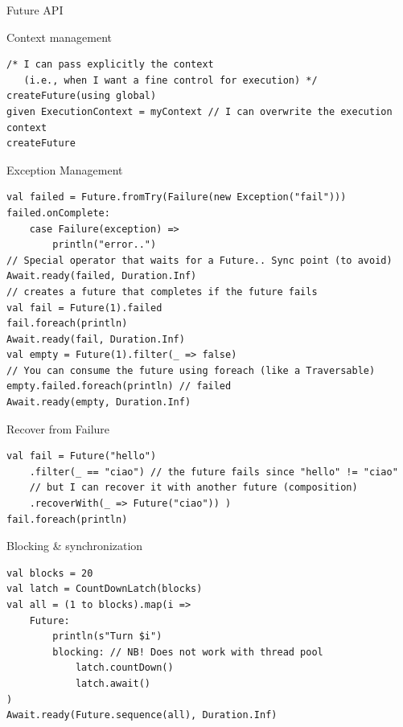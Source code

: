 \documentclass[presentation, 9pt]{beamer}\mode<presentation>{\usetheme{AMSBolognaFC}}
\begin{document}
\begin{frame}{Future API}
\begin{alertblock}{Context management}
\begin{tcolorbox}[left=0pt, top=0pt, bottom=0pt]
\begin{verbatim}
/* I can pass explicitly the context 
   (i.e., when I want a fine control for execution) */
createFuture(using global)
given ExecutionContext = myContext // I can overwrite the execution context
createFuture
						\end{verbatim}
					\end{tcolorbox}
\end{alertblock}
\begin{alertblock}{Exception Management}
	\begin{tcolorbox}[left=0pt, top=0pt, bottom=0pt]
		\begin{verbatim}
val failed = Future.fromTry(Failure(new Exception("fail")))
failed.onComplete:
	case Failure(exception) =>
		println("error..")
// Special operator that waits for a Future.. Sync point (to avoid)
Await.ready(failed, Duration.Inf)
// creates a future that completes if the future fails
val fail = Future(1).failed 
fail.foreach(println)
Await.ready(fail, Duration.Inf)
val empty = Future(1).filter(_ => false)
// You can consume the future using foreach (like a Traversable)
empty.failed.foreach(println) // failed
Await.ready(empty, Duration.Inf)
		\end{verbatim}
	\end{tcolorbox}
\end{alertblock}
\begin{alertblock}{Recover from Failure}
	\begin{tcolorbox}[left=0pt, top=0pt, bottom=0pt]
		\begin{verbatim}
val fail = Future("hello")
	.filter(_ == "ciao") // the future fails since "hello" != "ciao"
	// but I can recover it with another future (composition)
	.recoverWith(_ => Future("ciao")) )
fail.foreach(println)
		\end{verbatim}
	\end{tcolorbox}
\end{alertblock}
\begin{alertblock}{Blocking \& synchronization}
	\begin{tcolorbox}[left=0pt, top=0pt, bottom=0pt]
		\begin{verbatim}
val blocks = 20
val latch = CountDownLatch(blocks)
val all = (1 to blocks).map(i =>
	Future:
		println(s"Turn $i")
		blocking: // NB! Does not work with thread pool
			latch.countDown()
			latch.await()
)
Await.ready(Future.sequence(all), Duration.Inf)
		\end{verbatim}
	\end{tcolorbox}
\end{alertblock}
\end{frame}
\end{document}
